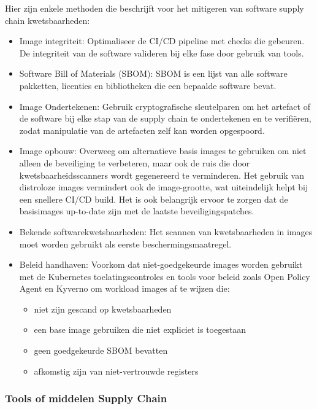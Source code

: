 Hier zijn enkele methoden die \textcite{OWASP-2023} beschrijft voor het mitigeren van software supply chain kwetsbaarheden:
\begin{itemize}
    \item Image integriteit: Optimaliseer de CI/CD pipeline met checks die gebeuren. De integriteit van de software valideren bij elke fase door gebruik van tools.
    \item Software Bill of Materials (SBOM): SBOM is een lijst van alle software pakketten, licenties en bibliotheken die een bepaalde software bevat.
    \item Image Ondertekenen: Gebruik cryptografische sleutelparen om het artefact of de software bij elke stap van de supply chain te ondertekenen en te verifiëren, zodat manipulatie van de artefacten zelf kan worden opgespoord.
    \item Image opbouw: Overweeg om alternatieve basis images te gebruiken om niet alleen de beveiliging te verbeteren, maar ook de ruis die door kwetsbaarheidsscanners wordt gegenereerd te verminderen. Het gebruik van distroloze images vermindert ook de image-grootte, wat uiteindelijk helpt bij een snellere CI/CD build. Het is ook belangrijk ervoor te zorgen dat de basisimages up-to-date zijn met de laatste beveiligingspatches. 
    \item Bekende softwarekwetsbaarheden: Het scannen van kwetsbaarheden in images moet worden gebruikt als eerste beschermingsmaatregel.
    \item Beleid handhaven: Voorkom dat niet-goedgekeurde images worden gebruikt met de Kubernetes toelatingscontroles en tools voor beleid zoals Open Policy Agent en Kyverno om workload images af te wijzen die:
    \begin{itemize}
        \item niet zijn gescand op kwetsbaarheden
        \item een base image gebruiken die niet expliciet is toegestaan
        \item geen goedgekeurde SBOM bevatten
        \item afkomstig zijn van niet-vertrouwde registers
    \end{itemize}   
\end{itemize}


\subsubsection{Tools of middelen Supply Chain}





